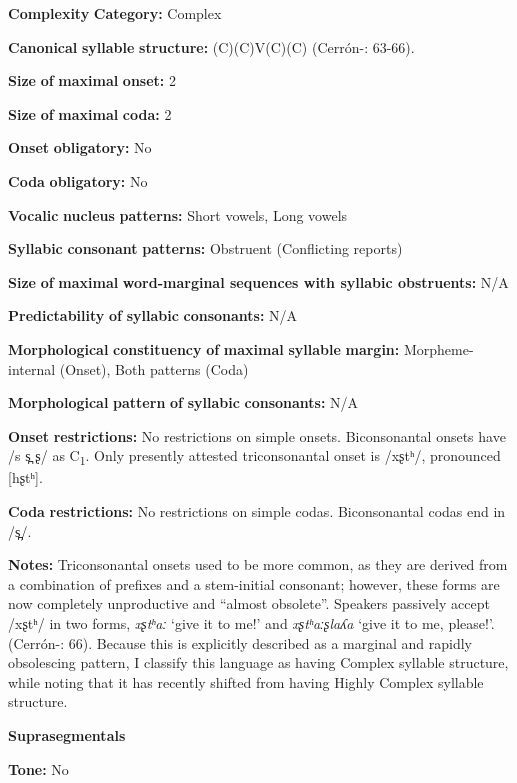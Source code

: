 \textbf{Complexity} \textbf{Category:} Complex

\textbf{Canonical} \textbf{syllable} \textbf{structure:} (C)(C)V(C)(C) (Cerrón-\citealt{Palomino2006}: 63-66).

\textbf{Size} \textbf{of} \textbf{maximal} \textbf{onset:} 2

\textbf{Size} \textbf{of} \textbf{maximal} \textbf{coda:} 2

\textbf{Onset} \textbf{obligatory:} No

\textbf{Coda} \textbf{obligatory:} No

\textbf{Vocalic} \textbf{nucleus} \textbf{patterns:} Short vowels, Long vowels

\textbf{Syllabic} \textbf{consonant} \textbf{patterns:} Obstruent (Conflicting reports)

\textbf{Size} \textbf{of} \textbf{maximal} \textbf{word{}-marginal sequences with syllabic obstruents:} N/A

\textbf{Predictability} \textbf{of} \textbf{syllabic} \textbf{consonants:} N/A

\textbf{Morphological} \textbf{constituency} \textbf{of} \textbf{maximal} \textbf{syllable} \textbf{margin:} Morpheme-internal (Onset), Both patterns (Coda)

\textbf{Morphological} \textbf{pattern} \textbf{of} \textbf{syllabic} \textbf{consonants:} N/A

\textbf{Onset} \textbf{restrictions:} No restrictions on simple onsets. Biconsonantal onsets have /s s̪ ʂ/ as C\textsubscript{1}. Only presently attested triconsonantal onset is /xʂtʰ/, pronounced [hʂtʰ].

\textbf{Coda} \textbf{restrictions:} No restrictions on simple codas. Biconsonantal codas end in /s̪/.

\textbf{Notes:} Triconsonantal onsets used to be more common, as they are derived from a combination of prefixes and a stem-initial consonant; however, these forms are now completely unproductive and “almost obsolete”. Speakers passively accept /xʂtʰ/ in two forms, \textit{xʂtʰaː} ‘give it to me!’ and \textit{xʂtʰaːʂlaʎa} ‘give it to me, please!’. (Cerrón-\citealt{Palomino2006}: 66). Because this is explicitly described as a marginal and rapidly obsolescing pattern, I classify this language as having Complex syllable structure, while noting that it has recently shifted from having Highly Complex syllable structure.

\textbf{Suprasegmentals}

\textbf{Tone:} No

